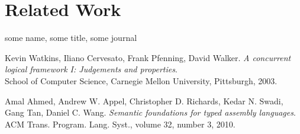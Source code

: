 \documentclass[submission,copyright,creativecommons]{eptcs}
\begin{document}
\section{Related Work}

\begin{thebibliography}{4} 
  
  some name, some title, some journal
  
    
  Kevin Watkins, Iliano Cervesato, Frank Pfenning, David Walker. \emph{A concurrent logical framework I: Judgements and properties}.\\
  School of Computer Science, Carnegie Mellon University, Pittsburgh, 2003.


  Amal Ahmed, Andrew W. Appel, Christopher D. Richards, Kedar N. Swadi, Gang Tan, Daniel C. Wang. \emph{Semantic foundations for typed assembly languages}.\\
  ACM Trans. Program. Lang. Syst., volume 32, number 3, 2010.

\end{thebibliography}
\end{document}
